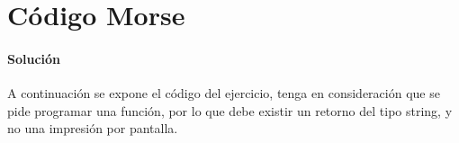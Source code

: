 
\section{Código Morse}

    \paragraph{Solución}
    A continuación se expone el código del ejercicio, tenga en consideración que se pide programar una función, por lo que debe existir un retorno del tipo string, y no una impresión por pantalla.
    
    
    